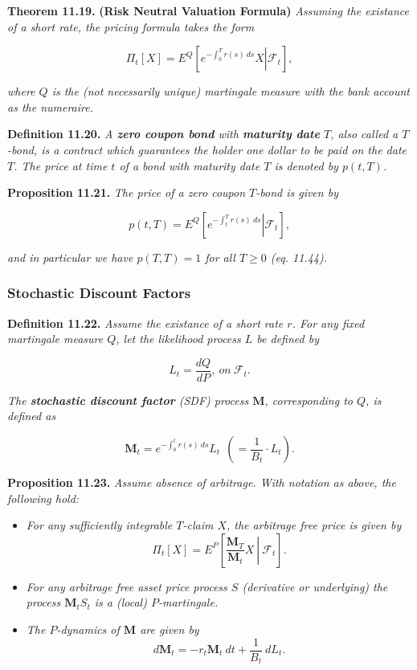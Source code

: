 \documentclass[
]{article}
\providecommand{\tightlist}{%
  \setlength{\itemsep}{0pt}\setlength{\parskip}{0pt}}
\begin{document}
\textbf{Theorem 11.19.} \textbf{(Risk Neutral Valuation Formula)}
\emph{Assuming the existance of a short rate, the pricing formula takes
the form}

\[
\Pi_t[X]=E^Q\left[\left.e^{-\int_0^Tr(s)\ ds}X\right\vert \mathcal{F}_t\right],\tag{11.42}
\]

\emph{where \(Q\) is the (not necessarily unique) martingale measure
with the bank account as the numeraire.}

\textbf{Definition 11.20.} \emph{A \textbf{zero coupon bond} with
\textbf{maturity date} \(T\), also called a \(T\)-bond, is a contract
which guarantees the holder one dollar to be paid on the date \(T\). The
price at time \(t\) of a bond with maturity date \(T\) is denoted by
\(p(t,T)\).}

\textbf{Proposition 11.21.} \emph{The price of a zero coupon \(T\)-bond
is given by}

\[
p(t,T)=E^Q\left[\left.e^{-\int_t^Tr(s)\ ds}\right\vert \mathcal{F}_t\right],\tag{11.43}
\]

\emph{and in particular we have \(p(T,T)=1\) for all \(T\ge 0\) (eq.
11.44).}

\hypertarget{stochastic-discount-factors-1}{%
\subsubsection{Stochastic Discount
Factors}\label{stochastic-discount-factors-1}}

\textbf{Definition 11.22.} \emph{Assume the existance of a short rate
\(r\). For any fixed martingale measure \(Q\), let the likelihood
process \(L\) be defined by}

\[
L_t=\frac{dQ}{dP},\ on\ \mathcal{F}_t.\tag{11.48}
\]

\emph{The \textbf{stochastic discount factor} (SDF) process
\(\mathbf{M}\), corresponding to \(Q\), is defined as}

\[
\mathbf{M}_t=e^{-\int_0^tr(s)\ ds}L_t\ \ \left(=\frac{1}{B_t}\cdot L_t\right).\tag{11.49/50}
\]

\textbf{Proposition 11.23.} \emph{Assume absence of arbitrage. With
notation as above, the following hold:}

\begin{itemize}
\tightlist
\item
  \emph{For any sufficiently integrable \(T\)-claim \(X\), the arbitrage
  free price is given by} \[
    \Pi_t[X]=E^P\left[\left. \frac{\mathbf{M}_T}{\mathbf{M}_t} X \ \right\vert\ \mathcal{F}_t\right].\tag{11.51}
    \]
\item
  \emph{For any arbitrage free asset price process \(S\) (derivative or
  underlying) the process \(\mathbf{M}_tS_t\) is a (local)
  \(P\)-martingale.}
\item
  \emph{The \(P\)-dynamics of \(\mathbf{M}\) are given by} \[
    d\mathbf{M}_t=-r_t\mathbf{M}_t\ dt+\frac{1}{B_t}\ dL_t.\tag{11.53}
    \]
\end{itemize}
\end{document}
